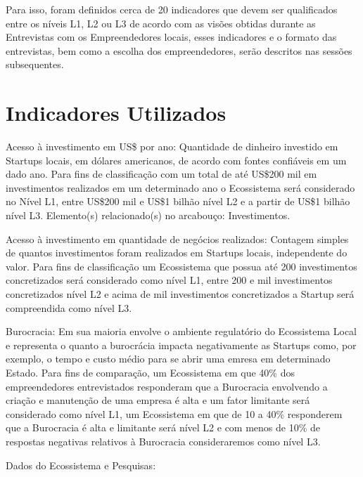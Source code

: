 Para isso, foram definidos cerca de 20 indicadores que devem ser qualificados entre os níveis L1, L2 ou L3 de acordo com as visões obtidas durante as Entrevistas com os Empreendedores locais, esses indicadores e o formato das entrevistas, bem como a escolha dos empreendedores, serão descritos nas sessões subsequentes. 

\section{Indicadores Utilizados}
\label{section:indicadores_utilizados}

\begin{description}
  \item Acesso à investimento em US\$ por ano: Quantidade de dinheiro investido em Startups locais, em dólares americanos, de acordo com fontes confiáveis em um dado ano. Para fins de classificação com um total de até US\$200 mil em investimentos realizados em um determinado ano o Ecossistema será considerado no Nível L1, entre US\$200 mil e US\$1 bilhão nível L2 e a partir de US\$1 bilhão nível L3. Elemento(s) relacionado(s) no arcabouço: Investimentos. 

  \item Acesso à investimento em quantidade de negócios realizados: Contagem simples de quantos investimentos foram realizados em Startups locais, independente do valor. Para fins de classificação um Ecossistema que possua até 200 investimentos concretizados será considerado como nível L1, entre 200 e mil investimentos concretizados nível L2 e acima de mil investimentos concretizados a Startup será compreendida como nível L3.

  \item Burocracia: Em sua maioria envolve o ambiente regulatório do Ecossistema Local e representa o quanto a burocrácia impacta negativamente as Startups como, por exemplo, o tempo e custo médio para se abrir uma emresa em determinado Estado. Para fins de comparação, um Ecossistema em que 40\% dos empreendedores entrevistados responderam que a Burocracia envolvendo a criação e manutenção de uma empresa é alta e um fator limitante será considerado como nível L1, um Ecossistema em que de 10 a 40\% responderem que a Burocracia é alta e limitante será nível L2 e com menos de 10\% de respostas negativas relativos à Burocracia consideraremos como nível L3.

  \item Dados do Ecossistema e Pesquisas:
  

\end{description}
